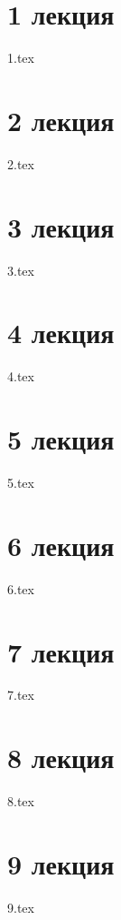 \tableofcontents
\newpage

\chapter{1 лекция}
{1.tex}
\chapter{2 лекция}
{2.tex}
\chapter{3 лекция}
{3.tex}
\chapter{4 лекция}
{4.tex}
\chapter{5 лекция}
{5.tex}
\chapter{6 лекция}
{6.tex}

\chapter{7 лекция}
{7.tex}

\chapter{8 лекция}
{8.tex}

\chapter{9 лекция}
{9.tex}




